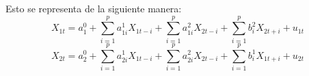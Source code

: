 Esto se representa de la siguiente manera:
\[
X_{1t}=a_{1}^{0}+\sum_{i=1}^p {a_{1i}^{1}X_{1t-i}} +\sum_{i=1}^p {a_{1i}^{2}X_{2t-i}} +\sum_{i=1}^p {b_{i}^{2}X_{2t+i}} +u_{1t}
\]
\[
X_{2t}=a_{2}^{0}+\sum_{i=1}^p {a_{2i}^{1}X_{1t-i}} +\sum_{i=1}^p {a_{2i}^{2}X_{2t-i}} +\sum_{i=1}^p {b_{i}^{1}X_{1t+i}} +u_{2t}
\]
%
%
%
%
%
%
%
%
%
%
%
%
